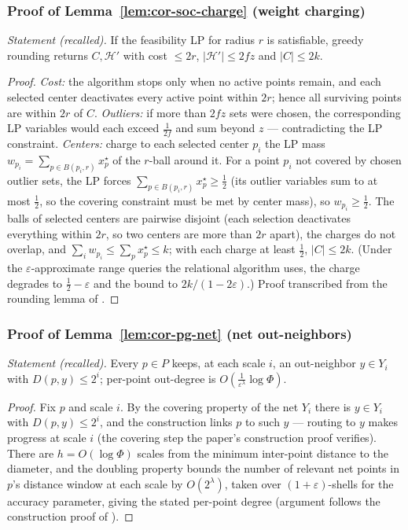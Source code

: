\subsubsection*{Proof of Lemma~\ref{lem:cor-soc-charge} (weight charging)}
{\itshape Statement (recalled).} If the feasibility LP for radius $r$
is satisfiable, greedy rounding returns $C, \mathcal{H}'$ with cost
$\le 2r$, $|\mathcal{H}'| \le 2fz$ and $|C| \le 2k$.\eop

\begin{proof}
\emph{Cost:} the algorithm stops only when no active points remain,
and each selected center deactivates every active point within $2r$;
hence all surviving points are within $2r$ of $C$. \emph{Outliers:} if
more than $2fz$ sets were chosen, the corresponding LP variables would
each exceed $\tfrac{1}{2f}$ and sum beyond $z$ --- contradicting the
LP constraint. \emph{Centers:} charge to each selected center $p_i$
the LP mass $w_{p_i} = \sum_{p \in B(p_i,r)} x^{\star}_p$ of the
$r$-ball around it. For a point $p_i$ not covered by chosen outlier
sets, the LP forces $\sum_{p \in B(p_i,r)} x^{\star}_p \ge
\tfrac12$ (its outlier variables sum to at most $\tfrac12$, so the
covering constraint must be met by center mass), so $w_{p_i} \ge
\tfrac12$. The balls of selected centers are pairwise disjoint (each
selection deactivates everything within $2r$, so two centers are more
than $2r$ apart), the charges do not overlap, and $\sum_i w_{p_i} \le
\sum_p x^{\star}_p \le k$; with each charge at least $\tfrac12$,
$|C| \le 2k$. (Under the $\varepsilon$-approximate range queries the
relational algorithm uses, the charge degrades to $\tfrac12 -
\varepsilon$ and the bound to $2k/(1-2\varepsilon)$.) Proof
transcribed from the rounding lemma of \citep{sigmod26-289}.
\end{proof}

\subsubsection*{Proof of Lemma~\ref{lem:cor-pg-net} (net out-neighbors)}
{\itshape Statement (recalled).} Every $p \in P$ keeps, at each scale
$i$, an out-neighbor $y \in Y_i$ with $D(p,y) \le 2^i$; per-point
out-degree is $O(\tfrac{1}{\varepsilon^\lambda}\log\Phi)$.\eop

\begin{proof}
Fix $p$ and scale $i$. By the covering property of the net $Y_i$
there is $y \in Y_i$ with $D(p,y) \le 2^i$, and the construction
links $p$ to such $y$ --- routing to $y$ makes progress at scale $i$
(the covering step the paper's construction proof verifies). There
are $h = O(\log\Phi)$ scales from the minimum inter-point distance to
the diameter, and the doubling property bounds the number of relevant
net points in $p$'s distance window at each scale by $O(2^\lambda)$,
taken over $(1+\varepsilon)$-shells for the accuracy parameter,
giving the stated per-point degree (argument follows the construction
proof of \citep{sigmod26-349}).
\end{proof}



